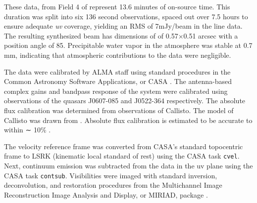



These data, from Field 4 of \citet{Mann2014} represent 13.6 minutes of on-source time. This duration was split into six 136 second observations, spaced out over 7.5 hours to ensure adequate \textit{uv} coverage, yielding an RMS of 7mJy/beam in the line data. The resulting synthesized beam has dimensions of of 0.57$\times$0.51 arcsec with a position angle of 85\degree. Precipitable water vapor in the atmosphere was stable at 0.7 mm, indicating that atmospheric contributions to the data were negligible.


The data were calibrated by ALMA staff using standard procedures in the Common Astronomy Software Applications, or CASA \citep{McMullin2007}. The antenna-based complex gains and bandpass response of the system were calibrated using observations of the quasars J0607-085 and J0522-364 respectively. The absolute flux calibration was determined from observations of Callisto. The model of Callisto was drawn from \citet{Butler2012}. Absolute flux calibration is estimated to be accurate to within ∼ 10\% \citep{Mann2014}.



The velocity reference frame was converted from CASA's standard topocentric frame to LSRK (kinematic local standard of rest) using the CASA task \texttt{cvel}. Next, continuum emission was subtracted from the data in the uv plane using the CASA task \texttt{contsub}. Visibilities were imaged with standard inversion, deconvolution, and restoration procedures from the Multichannel Image Reconstruction Image Analysis and Display, or MIRIAD, package \citep{Sault1995}.





